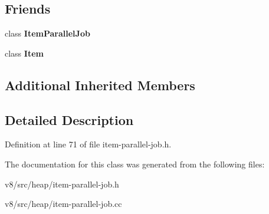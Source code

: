 \subsection*{Friends}
\begin{DoxyCompactItemize}
\item 
\mbox{\label{classv8_1_1internal_1_1ItemParallelJob_1_1Task_a7673714c73e382f4c253b761c43ed0ed}} 
class {\bfseries Item\+Parallel\+Job}
\item 
\mbox{\label{classv8_1_1internal_1_1ItemParallelJob_1_1Task_aad85754f188b769ff61150eaf36106c4}} 
class {\bfseries Item}
\end{DoxyCompactItemize}
\subsection*{Additional Inherited Members}


\subsection{Detailed Description}


Definition at line 71 of file item-\/parallel-\/job.\+h.



The documentation for this class was generated from the following files\+:\begin{DoxyCompactItemize}
\item 
v8/src/heap/item-\/parallel-\/job.\+h\item 
v8/src/heap/item-\/parallel-\/job.\+cc\end{DoxyCompactItemize}
